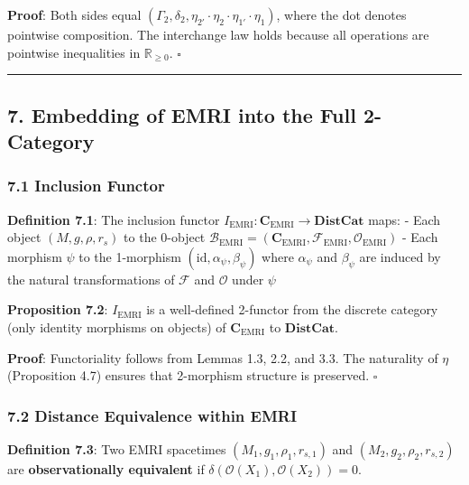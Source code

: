\documentclass[
]{article}
\begin{document}
\textbf{Proof}: Both sides equal
\((\Gamma_2, \delta_2, \eta_{2'} \cdot \eta_2 \cdot \eta_{1'} \cdot \eta_1)\),
where the dot denotes pointwise composition. The interchange law holds
because all operations are pointwise inequalities in
\(\mathbb{R}_{\geq 0}\). \(\square\)

\begin{center}\rule{0.5\linewidth}{0.5pt}\end{center}

\subsection{7. Embedding of EMRI into the Full
2-Category}\label{embedding-of-emri-into-the-full-2-category}

\subsubsection{7.1 Inclusion Functor}\label{inclusion-functor}

\textbf{Definition 7.1}: The inclusion functor
\(I_{\text{EMRI}}: \mathbf{C}_{\text{EMRI}} \to \mathbf{DistCat}\) maps:
- Each object \((M, g, \rho, r_s)\) to the 0-object
\(\mathcal{B}_{\text{EMRI}} = (\mathbf{C}_{\text{EMRI}}, \mathcal{F}_{\text{EMRI}}, \mathcal{O}_{\text{EMRI}})\)
- Each morphism \(\psi\) to the 1-morphism
\((\text{id}, \alpha_\psi, \beta_\psi)\) where \(\alpha_\psi\) and
\(\beta_\psi\) are induced by the natural transformations of
\(\mathcal{F}\) and \(\mathcal{O}\) under \(\psi\)

\textbf{Proposition 7.2}: \(I_{\text{EMRI}}\) is a well-defined
2-functor from the discrete category (only identity morphisms on
objects) of \(\mathbf{C}_{\text{EMRI}}\) to \(\mathbf{DistCat}\).

\textbf{Proof}: Functoriality follows from Lemmas 1.3, 2.2, and 3.3. The
naturality of \(\eta\) (Proposition 4.7) ensures that 2-morphism
structure is preserved. \(\square\)

\subsubsection{7.2 Distance Equivalence within
EMRI}\label{distance-equivalence-within-emri}

\textbf{Definition 7.3}: Two EMRI spacetimes
\((M_1, g_1, \rho_1, r_{s,1})\) and \((M_2, g_2, \rho_2, r_{s,2})\) are
\textbf{observationally equivalent} if
\(\delta(\mathcal{O}(X_1), \mathcal{O}(X_2)) = 0\).
\end{document}
